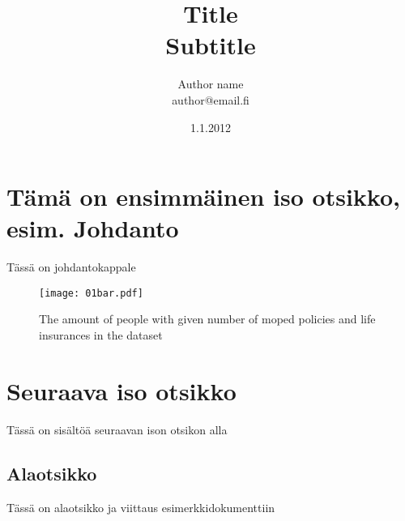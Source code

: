 \documentclass[a4paper]{article}
\begin{document}
\title{\huge Title \\ \large Subtitle}
\date{1.1.2012}
\author{Author name \\ author@email.fi}
\maketitle

\large

\section{Tämä on ensimmäinen iso otsikko, esim. Johdanto}

Tässä on johdantokappale

\begin{figure}[htb]
\centering
\texttt{[image: 01bar.pdf]}
\caption{The amount of people with given number of moped policies and life insurances in the dataset}
\label{01bar}
\end{figure}

\section{Seuraava iso otsikko}

Tässä on sisältöä seuraavan ison otsikon alla

\subsection{Alaotsikko}

Tässä on alaotsikko ja viittaus esimerkkidokumenttiin \citep{koski2012}




\end{document}

